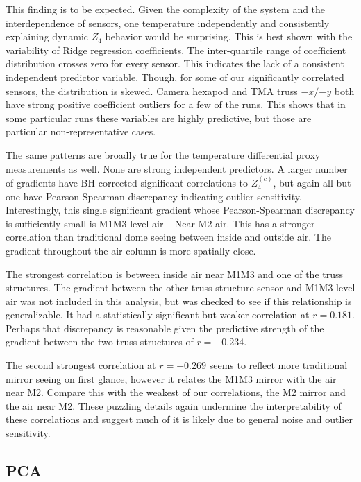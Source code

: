 \documentclass[SE,authoryear,toc]{lsstdoc}
\begin{document}
This finding is to be expected. Given the complexity of the system and the interdependence of sensors, one temperature independently and consistently explaining dynamic $Z_4$ behavior would be surprising. This is best shown with the variability of Ridge regression coefficients. The inter-quartile range of coefficient distribution crosses zero for every sensor. This indicates the lack of a consistent independent predictor variable. Though, for some of our significantly correlated sensors, the distribution is skewed. Camera hexapod and TMA truss $-x/{-y}$ both have strong positive coefficient outliers for a few of the runs. This shows that in some particular runs these variables are highly predictive, but those are particular non-representative cases.

The same patterns are broadly true for the temperature differential proxy measurements as well. None are strong independent predictors. A larger number of gradients have BH-corrected significant correlations to $Z_4^{(c)}$, but again all but one have Pearson-Spearman discrepancy indicating outlier sensitivity. Interestingly, this single significant gradient whose Pearson-Spearman discrepancy is sufficiently small is M1M3-level air -- Near-M2 air. This has a stronger correlation than traditional dome seeing between inside and outside air. The gradient throughout the air column is more spatially close. 

The strongest correlation is between inside air near M1M3 and one of the truss structures. The gradient between the other truss structure sensor and M1M3-level air was not included in this analysis, but was checked to see if this relationship is generalizable. It had a statistically significant but weaker correlation at $r=0.181$. Perhaps that discrepancy is reasonable given the predictive strength of the gradient between the two truss structures of $r = -0.234$. 

The second strongest correlation at $r=-0.269$ seems to reflect more traditional mirror seeing on first glance, however it relates the M1M3 mirror with the air near M2. Compare this with the weakest of our correlations, the M2 mirror and the air near M2. These puzzling details again undermine the interpretability of these correlations and suggest much of it is likely due to general noise and outlier sensitivity.


\subsection{PCA}
\end{document}
